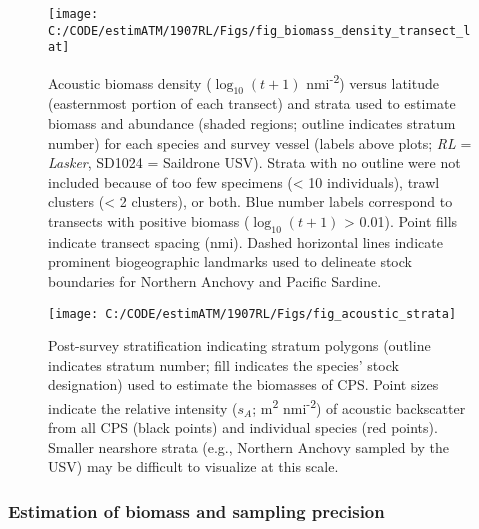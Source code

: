 \documentclass[]{article}
\newcommand{\blandscape}{\begin{landscape}} \newcommand{\elandscape}{\end{landscape}}
\begin{document}
\newpage



\newpage
\blandscape

\begin{figure}[H]

{\centering \texttt{[image: C:/CODE/estimATM/1907RL/Figs/fig\_biomass\_density\_transect\_lat]} 

}

\caption{Acoustic biomass density (\(\log_{10}(t+1)\) nmi\textsuperscript{-2}) versus latitude (easternmost portion of each transect) and strata used to estimate biomass and abundance (shaded regions; outline indicates stratum number) for each species and survey vessel (labels above plots; \emph{RL} = \emph{Lasker}, SD1024 = Saildrone USV). Strata with no outline were not included because of too few specimens (\textless{} 10 individuals), trawl clusters (\textless{} 2 clusters), or both. Blue number labels correspond to transects with positive biomass (\(\log_{10}(t+1)\) \textgreater{} 0.01). Point fills indicate transect spacing (nmi). Dashed horizontal lines indicate prominent biogeographic landmarks used to delineate stock boundaries for Northern Anchovy and Pacific Sardine.}\label{fig:tx-biom-dens}
\end{figure}

\elandscape
\newpage



\begin{figure}[H]

{\centering \texttt{[image: C:/CODE/estimATM/1907RL/Figs/fig\_acoustic\_strata]} 

}

\caption{Post-survey stratification indicating stratum polygons (outline indicates stratum number; fill indicates the species' stock designation) used to estimate the biomasses of CPS. Point sizes indicate the relative intensity (\(s_A\); m\textsuperscript{2} nmi\textsuperscript{-2}) of acoustic backscatter from all CPS (black points) and individual species (red points). Smaller nearshore strata (e.g., Northern Anchovy sampled by the USV) may be difficult to visualize at this scale.}\label{fig:acoustic-strata-map}
\end{figure}

\newpage

\hypertarget{methods-biomass-and-precision}{%
\subsubsection{Estimation of biomass and sampling precision}\label{methods-biomass-and-precision}}
\end{document}
